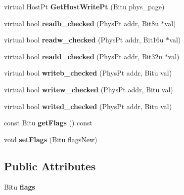 \begin{DoxyCompactItemize}
\item 
\hypertarget{classPageHandler_afcbb0383657c9f0342c023094789a839}{virtual Host\-Pt {\bfseries Get\-Host\-Write\-Pt} (Bitu phys\-\_\-page)}\label{classPageHandler_afcbb0383657c9f0342c023094789a839}

\item 
\hypertarget{classPageHandler_a22baf1a74f4599d9b26e6eb582815980}{virtual bool {\bfseries readb\-\_\-checked} (Phys\-Pt addr, Bit8u $\ast$val)}\label{classPageHandler_a22baf1a74f4599d9b26e6eb582815980}

\item 
\hypertarget{classPageHandler_a83c88b98cb1182558b41df20f1564cd4}{virtual bool {\bfseries readw\-\_\-checked} (Phys\-Pt addr, Bit16u $\ast$val)}\label{classPageHandler_a83c88b98cb1182558b41df20f1564cd4}

\item 
\hypertarget{classPageHandler_a09456e4b9f62d20577e195f44f946512}{virtual bool {\bfseries readd\-\_\-checked} (Phys\-Pt addr, Bit32u $\ast$val)}\label{classPageHandler_a09456e4b9f62d20577e195f44f946512}

\item 
\hypertarget{classPageHandler_adbfe1710267fb171ef1245e2bc03a7e5}{virtual bool {\bfseries writeb\-\_\-checked} (Phys\-Pt addr, Bitu val)}\label{classPageHandler_adbfe1710267fb171ef1245e2bc03a7e5}

\item 
\hypertarget{classPageHandler_ad5b3da76c9c00d62a12e1d1257d02dcb}{virtual bool {\bfseries writew\-\_\-checked} (Phys\-Pt addr, Bitu val)}\label{classPageHandler_ad5b3da76c9c00d62a12e1d1257d02dcb}

\item 
\hypertarget{classPageHandler_ace24d6d6523e373ed68691922e8da103}{virtual bool {\bfseries writed\-\_\-checked} (Phys\-Pt addr, Bitu val)}\label{classPageHandler_ace24d6d6523e373ed68691922e8da103}

\item 
\hypertarget{classPageHandler_a352d52997241c574d4ef7f12d842f697}{const Bitu {\bfseries get\-Flags} () const }\label{classPageHandler_a352d52997241c574d4ef7f12d842f697}

\item 
\hypertarget{classPageHandler_a14611a8cfa950d5305d074252189139a}{void {\bfseries set\-Flags} (Bitu flags\-New)}\label{classPageHandler_a14611a8cfa950d5305d074252189139a}

\end{DoxyCompactItemize}
\subsection*{Public Attributes}
\begin{DoxyCompactItemize}
\item 
\hypertarget{classPageHandler_afdba8b3717029016c4b530339a2440d3}{Bitu {\bfseries flags}}\label{classPageHandler_afdba8b3717029016c4b530339a2440d3}

\end{DoxyCompactItemize}


